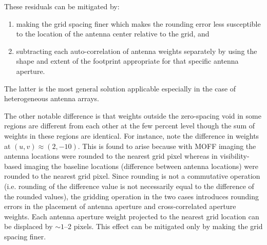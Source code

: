 \documentclass[a4paper,fleqn,usenatbib]{../mnras}
\begin{document}
These residuals can be mitigated by: 
\begin{enumerate}
  \item making the grid spacing finer which makes the rounding error less 
    susceptible to the location of the antenna center relative to the grid, 
    and
  \item subtracting each auto-correlation of antenna weights separately by 
    using the shape and extent of the footprint appropriate for that specific
    antenna aperture. 
\end{enumerate}
The latter is the most general solution applicable especially in the case of 
heterogeneous antenna arrays.

The other notable difference is that weights outside the zero-spacing void in
some regions are different from each other at the few percent level though the 
sum of weights in these regions are identical. For instance, note the 
difference in weights at $(u,v)\approx (2,-10)$. This is found to arise 
because with MOFF imaging the antenna locations were rounded to the nearest 
grid pixel whereas in visibility-based imaging the baseline locations 
(difference between antenna locations) were rounded to the nearest grid pixel. 
Since rounding is not a commutative operation (i.e. rounding of the difference 
value is not necessarily equal to the difference of the rounded values), the 
gridding operation in the two cases introduces rounding errors in the placement 
of antenna aperture and cross-correlated aperture weights. Each antenna 
aperture weight projected to the nearest grid location can be displaced by 
$\sim 1$--2 pixels. This effect can be mitigated only by making the grid 
spacing finer. 
\end{document}
